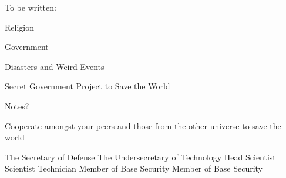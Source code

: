 \documentclass[blue]{guildcamp3}
\begin{document}
To be written:

Religion

Government

Disasters and Weird Events

Secret Government Project to Save the World

\begin{itemz}[Notes]
	\item Notes?
\end{itemz}

\begin{itemz}[Goals]
	\item Cooperate amongst your peers and those from the other universe to save the world
\end{itemz}


\begin{members}
	\member{\cPolOne{}} The Secretary of Defense
	\member{\cPolTwo{}} The Undersecretary of Technology
	\member{\cSciOne{}} Head Scientist
	\member{\cSciTwo{}} Scientist
	\member{\cTech{}} Technician
	\member{\cSpecOpOne{}} Member of Base Security
	\member{\cSpecOpTwo{}} Member of Base Security
\end{members}
\end{document}
